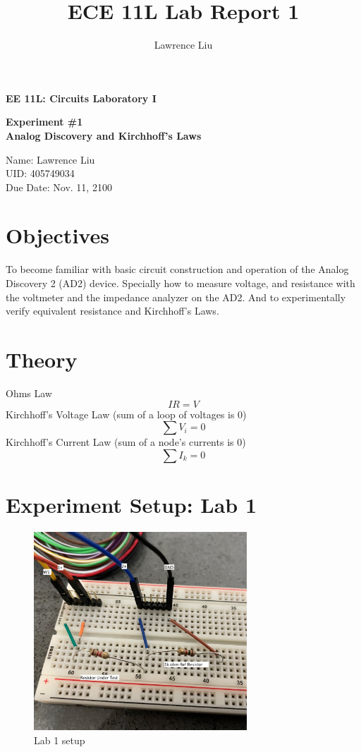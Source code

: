 \documentclass[12pt]{article}
\title{ECE 11L Lab Report 1}
\author{Lawrence Liu}
\begin{document}
\begin{titlepage}
   \begin{center}
       \vspace*{1cm}

       \textbf{EE 11L: Circuits Laboratory I}

       \vspace{2cm}

       \textbf{Experiment \#1}\\
       \textbf{Analog Discovery and Kirchhoff’s Laws}

            
       \vspace{4cm}
     
            
       Name: Lawrence Liu\\
		UID: 405749034\\
		Due Date: Nov. 11, 2100
            
   \end{center}
\end{titlepage}
\section*{Objectives}
To become familiar with basic circuit construction and operation of the Analog  Discovery 2 (AD2) device. Specially how to measure voltage, and resistance with the voltmeter and the impedance analyzer on the AD2. And to experimentally verify equivalent resistance and Kirchhoff’s Laws.
\section*{Theory}
Ohms Law
$$IR=V$$
Kirchhoff’s Voltage Law (sum of a loop of voltages is 0)
$$\sum V_i=0$$
Kirchhoff’s Current Law (sum of a node's currents is 0)
$$\sum I_k=0$$
\pagebreak
\section*{Experiment Setup: Lab 1}
\begin{figure}[h]
\includegraphics[width=8cm]{ResistorMeasurment}
\centering
\caption{Lab 1 setup}
\end{figure}
\end{document}
